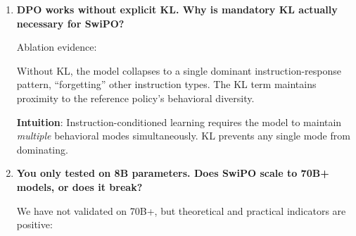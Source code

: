 \begin{enumerate}[label=\textbf{Q\arabic*.}, leftmargin=*, itemsep=8pt]
\textbf{Why the gap?} Prompting operates at the surface level: the model \textit{follows} instructions but doesn't \textit{internalize} them. SwiPO trains instruction-conditioned preferences into the weights, making behavioral changes robust to adversarial prompt injections.

\textbf{Jailbreak resistance}: Prompt-based control is trivially bypassed by ``ignore previous instructions.'' SwiPO's trained behavior resists such attacks.

\vspace{4mm}

\item \textbf{DPO works without explicit KL. Why is mandatory KL actually necessary for SwiPO?}

 Ablation evidence:

\begin{table}[ht!]
\centering
\normalsize
\renewcommand{\arraystretch}{1.2}
\caption{Ablation: effect of mandatory KL ($\lambda_{\text{KL}}$) on SwiPO performance.}
\label{tab:faq_kl_ablation}
\end{table}

Without KL, the model collapses to a single dominant instruction-response pattern, ``forgetting'' other instruction types. The KL term maintains proximity to the reference policy's behavioral diversity.

\textbf{Intuition}: Instruction-conditioned learning requires the model to maintain \textit{multiple} behavioral modes simultaneously. KL prevents any single mode from dominating.

\vspace{4mm}

\item \textbf{You only tested on 8B parameters. Does SwiPO scale to 70B+ models, or does it break?}

 We have not validated on 70B+, but theoretical and practical indicators are positive:


\end{enumerate}
